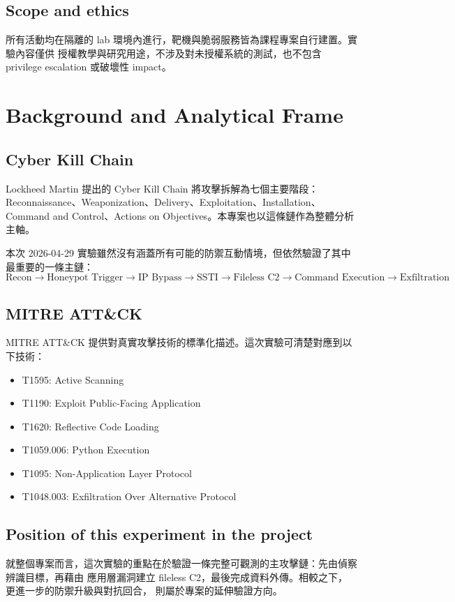 \documentclass[UTF8,11pt]{ctexart}
\begin{document}
\subsection{Scope and ethics}
所有活動均在隔離的 lab 環境內進行，靶機與脆弱服務皆為課程專案自行建置。實驗內容僅供
授權教學與研究用途，不涉及對未授權系統的測試，也不包含 privilege escalation 或破壞性
impact。

\section{Background and Analytical Frame}

\subsection{Cyber Kill Chain}
Lockheed Martin 提出的 Cyber Kill Chain 將攻擊拆解為七個主要階段：
Reconnaissance、Weaponization、Delivery、Exploitation、Installation、
Command and Control、Actions on Objectives。本專案也以這條鏈作為整體分析主軸。

本次 2026-04-29 實驗雖然沒有涵蓋所有可能的防禦互動情境，但依然驗證了其中最重要的一條主鏈：
\[
\text{Recon} \rightarrow
\text{Honeypot Trigger} \rightarrow
\text{IP Bypass} \rightarrow
\text{SSTI} \rightarrow
\text{Fileless C2} \rightarrow
\text{Command Execution} \rightarrow
\text{Exfiltration}
\]

\subsection{MITRE ATT\&CK}
MITRE ATT\&CK 提供對真實攻擊技術的標準化描述。這次實驗可清楚對應到以下技術：
\begin{itemize}[leftmargin=*]
  \item T1595: Active Scanning
  \item T1190: Exploit Public-Facing Application
  \item T1620: Reflective Code Loading
  \item T1059.006: Python Execution
  \item T1095: Non-Application Layer Protocol
  \item T1048.003: Exfiltration Over Alternative Protocol
\end{itemize}

\subsection{Position of this experiment in the project}
就整個專案而言，這次實驗的重點在於驗證一條完整可觀測的主攻擊鏈：先由偵察辨識目標，再藉由
應用層漏洞建立 fileless C2，最後完成資料外傳。相較之下，更進一步的防禦升級與對抗回合，
則屬於專案的延伸驗證方向。
\end{document}
